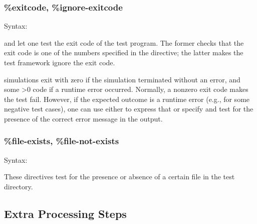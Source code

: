 \subsubsection{\%exitcode, \%ignore-exitcode}
\label{sec:testing:opptest:exitcode}

Syntax:
\begin{filelisting}
\end{filelisting}

\begin{filelisting}
\end{filelisting}

 and  let one test the exit code of the
test program. The former checks that the exit code is one of the numbers specified in
the directive; the latter makes the test framework ignore the exit code.

{\opp} simulations exit with zero if the simulation terminated
without an error, and some >0 code if a runtime error occurred. Normally,
a nonzero exit code makes the test fail. However, if the expected outcome
is a runtime error (e.g., for some negative test cases), one can use either
 to express that or specify 
and test for the presence of the correct error message in the output.



\subsubsection{\%file-exists, \%file-not-exists}
\label{sec:testing:opptest:file-exists}

Syntax:

\begin{filelisting}
\end{filelisting}

\begin{filelisting}
\end{filelisting}

These directives test for the presence or absence of a certain file in
the test directory.

\subsection{Extra Processing Steps}
\label{sec:testing:opptest:extra-processing-steps}

